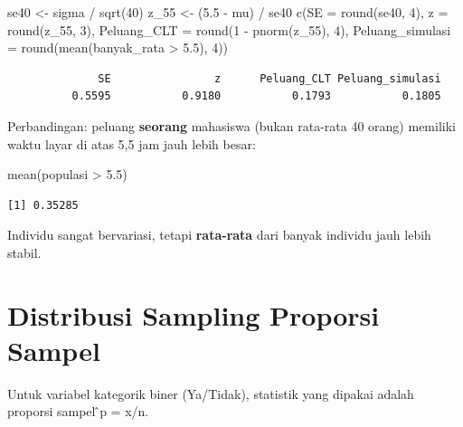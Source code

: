 \documentclass[
  indonesian,
  letterpaper,
]{book}
\newenvironment{Shaded}{\begin{snugshade}}{\end{snugshade}}
\newcommand{\AttributeTok}[1]{\textcolor[rgb]{0.40,0.45,0.13}{#1}}
\newcommand{\DecValTok}[1]{\textcolor[rgb]{0.68,0.00,0.00}{#1}}
\newcommand{\FloatTok}[1]{\textcolor[rgb]{0.68,0.00,0.00}{#1}}
\newcommand{\FunctionTok}[1]{\textcolor[rgb]{0.28,0.35,0.67}{#1}}
\newcommand{\NormalTok}[1]{\textcolor[rgb]{0.00,0.23,0.31}{#1}}
\newcommand{\OtherTok}[1]{\textcolor[rgb]{0.00,0.23,0.31}{#1}}
\newcommand{\SpecialCharTok}[1]{\textcolor[rgb]{0.37,0.37,0.37}{#1}}
\begin{document}
\begin{Shaded}
\begin{Highlighting}[]
\NormalTok{se40 }\OtherTok{\textless{}{-}}\NormalTok{ sigma }\SpecialCharTok{/} \FunctionTok{sqrt}\NormalTok{(}\DecValTok{40}\NormalTok{)}
\NormalTok{z\_55 }\OtherTok{\textless{}{-}}\NormalTok{ (}\FloatTok{5.5} \SpecialCharTok{{-}}\NormalTok{ mu) }\SpecialCharTok{/}\NormalTok{ se40}
\FunctionTok{c}\NormalTok{(}\AttributeTok{SE =} \FunctionTok{round}\NormalTok{(se40, }\DecValTok{4}\NormalTok{), }\AttributeTok{z =} \FunctionTok{round}\NormalTok{(z\_55, }\DecValTok{3}\NormalTok{),}
\AttributeTok{Peluang\_CLT =} \FunctionTok{round}\NormalTok{(}\DecValTok{1} \SpecialCharTok{{-}} \FunctionTok{pnorm}\NormalTok{(z\_55), }\DecValTok{4}\NormalTok{),}
\AttributeTok{Peluang\_simulasi =} \FunctionTok{round}\NormalTok{(}\FunctionTok{mean}\NormalTok{(banyak\_rata }\SpecialCharTok{\textgreater{}} \FloatTok{5.5}\NormalTok{), }\DecValTok{4}\NormalTok{))}
\end{Highlighting}
\end{Shaded}

\begin{verbatim}
              SE                z      Peluang_CLT Peluang_simulasi 
          0.5595           0.9180           0.1793           0.1805 
\end{verbatim}

Perbandingan: peluang \textbf{seorang} mahasiswa (bukan rata-rata 40
orang) memiliki waktu layar di atas 5,5 jam jauh lebih besar:

\begin{Shaded}
\begin{Highlighting}[]
\FunctionTok{mean}\NormalTok{(populasi }\SpecialCharTok{\textgreater{}} \FloatTok{5.5}\NormalTok{)}
\end{Highlighting}
\end{Shaded}

\begin{verbatim}
[1] 0.35285
\end{verbatim}

Individu sangat bervariasi, tetapi \textbf{rata-rata} dari banyak
individu jauh lebih stabil.

\section{Distribusi Sampling Proporsi
Sampel}\label{distribusi-sampling-proporsi-sampel}

Untuk variabel kategorik biner (Ya/Tidak), statistik yang dipakai adalah
proporsi sampel ̂p = x/n.
\end{document}
